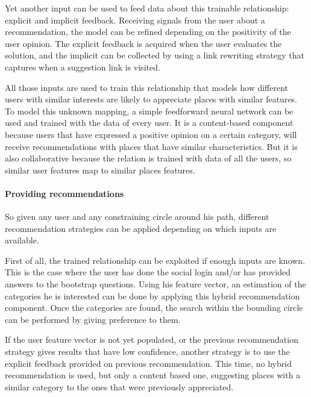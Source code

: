 Yet another input can be used to feed data about this trainable relationship: explicit and implicit feedback. Receiving signals from the user about a recommendation, the model can be refined depending on the positivity of the user opinion. The explicit feedback is acquired when the user evaluates the solution, and the implicit can be collected by using a link rewriting strategy that captures when a suggestion link is visited.

All those inputs are used to train this relationship that models how different users with similar interests are likely to appreciate places with similar features. To model this unknown mapping, a simple feedforward neural network can be used and trained with the data of every user. It is a content-based component because users that have expressed a positive opinion on a certain category, will receive recommendations with places that have similar characteristics. But it is also collaborative because the relation is trained with data of all the users, so similar user features map to similar places features.

\paragraph{Providing recommendations}
So given any user and any constraining circle around his path, different recommendation strategies can be applied depending on which inputs are available.

First of all, the trained relationship can be exploited if enough inputs are known. This is the case where the user has done the social login and/or has provided answers to the bootstrap questions. Using his feature vector, an estimation of the categories he is interested can be done by applying this hybrid recommendation component. Once the categories are found, the search within the bounding circle can be performed by giving preference to them.

If the user feature vector is not yet populated, or the previous recommendation strategy gives results that have low confidence, another strategy is to use the explicit feedback provided on previous recommendation. This time, no hybrid recommendation is used, but only a content based one, suggesting places with a similar category to the ones that were previously appreciated.

